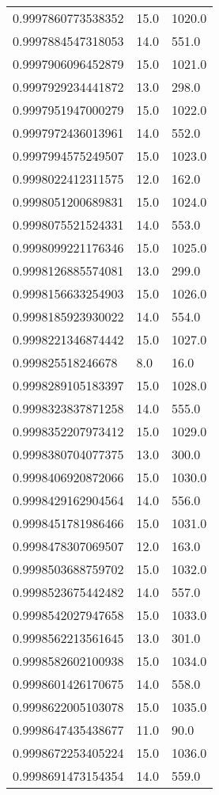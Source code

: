 \begin{center}
\begin{supertabular}[H]{p{0.30\textwidth}p{0.05\textwidth}p{0.05\textwidth}}
0.9997860773538352 & 15.0 & 1020.0 \\ 
0.9997884547318053 & 14.0 & 551.0 \\ 
0.9997906096452879 & 15.0 & 1021.0 \\ 
0.9997929234441872 & 13.0 & 298.0 \\ 
0.9997951947000279 & 15.0 & 1022.0 \\ 
0.9997972436013961 & 14.0 & 552.0 \\ 
0.9997994575249507 & 15.0 & 1023.0 \\ 
0.9998022412311575 & 12.0 & 162.0 \\ 
0.9998051200689831 & 15.0 & 1024.0 \\ 
0.9998075521524331 & 14.0 & 553.0 \\ 
0.9998099221176346 & 15.0 & 1025.0 \\ 
0.9998126885574081 & 13.0 & 299.0 \\ 
0.9998156633254903 & 15.0 & 1026.0 \\ 
0.9998185923930022 & 14.0 & 554.0 \\ 
0.9998221346874442 & 15.0 & 1027.0 \\ 
0.999825518246678 & 8.0 & 16.0 \\ 
0.9998289105183397 & 15.0 & 1028.0 \\ 
0.9998323837871258 & 14.0 & 555.0 \\ 
0.9998352207973412 & 15.0 & 1029.0 \\ 
0.9998380704077375 & 13.0 & 300.0 \\ 
0.9998406920872066 & 15.0 & 1030.0 \\ 
0.9998429162904564 & 14.0 & 556.0 \\ 
0.9998451781986466 & 15.0 & 1031.0 \\ 
0.9998478307069507 & 12.0 & 163.0 \\ 
0.9998503688759702 & 15.0 & 1032.0 \\ 
0.9998523675442482 & 14.0 & 557.0 \\ 
0.9998542027947658 & 15.0 & 1033.0 \\ 
0.9998562213561645 & 13.0 & 301.0 \\ 
0.9998582602100938 & 15.0 & 1034.0 \\ 
0.9998601426170675 & 14.0 & 558.0 \\ 
0.9998622005103078 & 15.0 & 1035.0 \\ 
0.9998647435438677 & 11.0 & 90.0 \\ 
0.9998672253405224 & 15.0 & 1036.0 \\ 
0.9998691473154354 & 14.0 & 559.0 \\ 

\end{supertabular}
\end{center}

